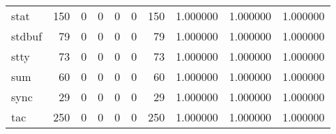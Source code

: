 \begin{longtable}{lrrrrrrrrr}
stat      &                                       150 &                                                  0 &                                                  0 &                                                  0 &                                                  0 &                                                150 &                                           1.000000 &                               1.000000 &                             1.000000 \\
stdbuf    &                                        79 &                                                  0 &                                                  0 &                                                  0 &                                                  0 &                                                 79 &                                           1.000000 &                               1.000000 &                             1.000000 \\
stty      &                                        73 &                                                  0 &                                                  0 &                                                  0 &                                                  0 &                                                 73 &                                           1.000000 &                               1.000000 &                             1.000000 \\
sum       &                                        60 &                                                  0 &                                                  0 &                                                  0 &                                                  0 &                                                 60 &                                           1.000000 &                               1.000000 &                             1.000000 \\
sync      &                                        29 &                                                  0 &                                                  0 &                                                  0 &                                                  0 &                                                 29 &                                           1.000000 &                               1.000000 &                             1.000000 \\
tac       &                                       250 &                                                  0 &                                                  0 &                                                  0 &                                                  0 &                                                250 &                                           1.000000 &                               1.000000 &                             1.000000 \\

\end{longtable}
